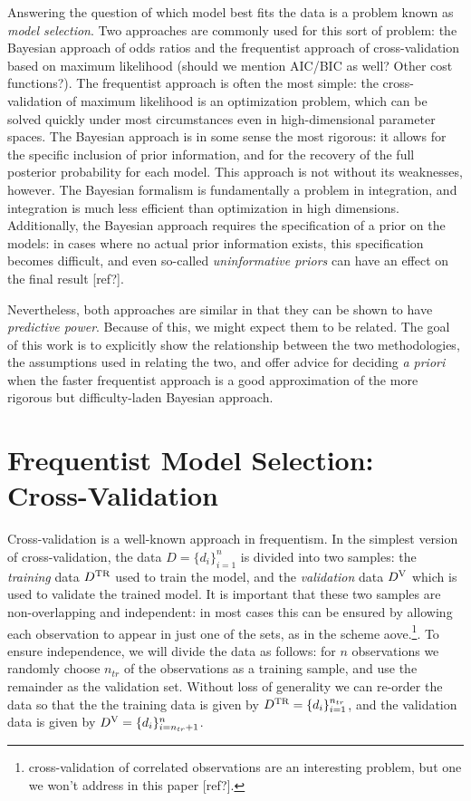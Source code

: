 \documentclass[12pt]{article}
\newcommand{\Dtr}{\ensuremath{D^{\rm TR}}}
\newcommand{\Dva}{\ensuremath{D^{\rm V}}}
\begin{document}
Answering the question of which model best fits the data is a problem known
as {\it model selection}.  Two approaches are commonly used for this sort
of problem: the Bayesian approach of odds ratios and the frequentist approach
of cross-validation based on maximum likelihood
(should we mention AIC/BIC as well? Other cost functions?).
The frequentist approach is often the most simple: the cross-validation of
maximum likelihood is an optimization problem, which can be solved quickly
under most circumstances even in high-dimensional parameter spaces.
The Bayesian approach is in some sense the most rigorous: it allows for the
specific inclusion of prior information, and for the recovery of the full
posterior probability for each model.  This approach is not without its
weaknesses, however.  The Bayesian formalism is fundamentally a problem in
integration, and integration is much less efficient than optimization in
high dimensions.  Additionally, the Bayesian approach requires the
specification of a prior on the models: in cases where no actual prior
information exists, this specification becomes difficult, and even
so-called {\it uninformative priors} can have an effect on the final
result [ref?].

Nevertheless, both approaches are similar in that they can be shown to
have {\it predictive power}.  Because of this, we might expect them to
be related.  The goal of this work is to explicitly show the relationship
between the two methodologies, the assumptions used in relating the two,
and offer advice for deciding {\it a priori} when the faster frequentist
approach is a good approximation of the more rigorous but difficulty-laden
Bayesian approach.

\section{Frequentist Model Selection: Cross-Validation}
Cross-validation is a well-known approach in frequentism.  In the simplest
version of cross-validation, the data $D = \{d_i\}_{i=1}^n$
is divided into two samples:
the {\it training} data \Dtr{} used to train the model, and the
{\it validation} data \Dva{} which is used to validate the trained
model. It is important that these two samples are
non-overlapping and independent: in most cases this can be ensured by
allowing each observation to appear in just one of the sets, as in the
scheme aove.\footnote{cross-validation of correlated observations are
an interesting problem, but one we won't address in this paper [ref?].}.
To ensure independence, we will divide the data as follows: for $n$
observations we randomly choose $n_{tr}$ of the observations
as a training sample, and use the remainder as the validation set.
Without loss of generality we can re-order the data so that the
the training data is given by $\Dtr = \{d_i\}_{i=1}^{n_{tr}}$,
and the validation data is given by $\Dva = \{d_i\}_{i=n_{tr}+1}^{n}$.
\end{document}
